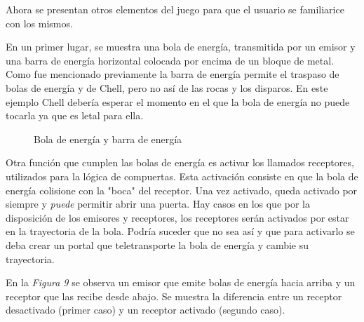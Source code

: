 \documentclass[a4paper]{article}
\begin{document}
Ahora se presentan otros elementos del juego para que el usuario se familiarice con los mismos. 

En un primer lugar, se muestra una bola de energía, transmitida por un emisor y una barra de energía horizontal colocada por encima de un bloque de metal. Como fue mencionado previamente la barra de energía permite el traspaso de bolas de energía y de Chell, pero no así de las rocas y los disparos. En este ejemplo Chell debería esperar el momento en el que la bola de energía no puede tocarla ya que es letal para ella.

\begin{figure}[!h]
	\caption{Bola de energía y barra de energía}
	\label{fig:diagrama8}
\end{figure}

Otra función que cumplen las bolas de energía es activar los llamados receptores, utilizados para la lógica de compuertas. Esta activación consiste en que la bola de energía colisione con la "boca" del receptor. Una vez activado, queda activado por siempre y \textit{puede} permitir abrir una puerta. Hay casos en los que por la disposición de los emisores y receptores, los receptores serán activados por estar en la trayectoria de la bola. Podría suceder que no sea así y que para activarlo se deba crear un portal que teletransporte la bola de energía y cambie su trayectoria.

En la \textit{Figura 9} se observa un emisor que emite bolas de energía hacia arriba y un receptor que las recibe desde abajo. Se muestra la diferencia entre un receptor desactivado (primer caso) y un receptor activado (segundo caso).
\end{document}
